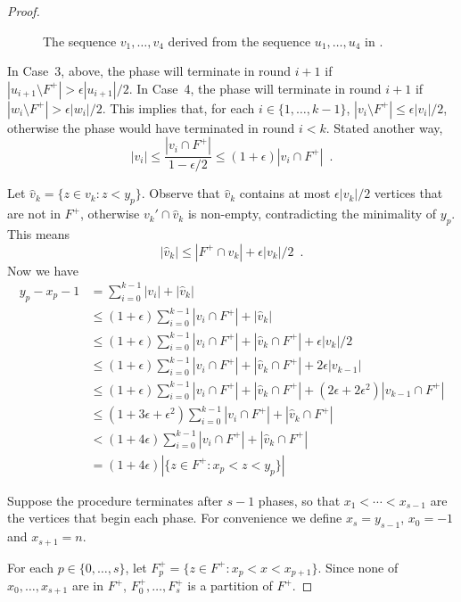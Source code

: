 \documentclass{patmorin}
\begin{document}
\begin{proof}
  \begin{figure}
    \caption{The sequence $v_1,\ldots,v_4$ derived from the sequence $u_1,\ldots,u_4$ in .}
  \end{figure}

  In Case~3, above, the phase will terminate in round $i+1$ if
  $|u_{i+1}\setminus F^+|>\epsilon|u_{i+1}|/2$.  In Case~4, the phase
  will terminate in round $i+1$ if $|w_i\setminus F^+|>\epsilon|w_i|/2$.
  This implies that, for each $i\in\{1,\ldots,k-1\}$, $|v_i\setminus
  F^+|\le\epsilon|v_i|/2$, otherwise the phase would have terminated
  in round $i<k$.  Stated another way,
  \[
    |v_i|\le \frac{|v_i\cap F^+|}{1-\epsilon/2} \le (1+\epsilon)|v_i\cap F^+| \enspace .
  \]

  Let $\hat{v}_k=\{z\in v_k:z< y_p\}$.  Observe that $\hat{v}_k$ contains
  at most $\epsilon|v_k|/2$ vertices that are not in $F^+$, otherwise
  $v_k'\cap \hat{v}_k$ is non-empty, contradicting the minimality of $y_p$. 
  This means
  \[    |\hat{v}_k| \le |F^+\cap \hat{v}_k| + \epsilon|v_k|/2 \enspace .
  \]
  Now we have
  \begin{align*}
    y_p - x_p - 1 & = \sum_{i=0}^{k-1} |v_i| + |\hat{v}_k|  \\
    & \le (1+\epsilon)\sum_{i=0}^{k-1} |v_i\cap F^+| + |\hat{v}_k| \\
    & \le (1+\epsilon)\sum_{i=0}^{k-1} |v_i\cap F^+| + |\hat{v}_k\cap F^+| + \epsilon|v_k|/2 \\ 
    & \le  (1+\epsilon)\sum_{i=0}^{k-1}|v_i\cap F^+| + |\hat{v}_k\cap F^+| + 2\epsilon|v_{k-1}| \\ 
    & \le  (1+\epsilon)\sum_{i=0}^{k-1}|v_i\cap F^+| + |\hat{v}_k\cap F^+| + (2\epsilon+2\epsilon^2)|v_{k-1}\cap F^+| \\ 
    & \le  (1+3\epsilon+\epsilon^2)\sum_{i=0}^{k-1}|v_i\cap F^+| + |\hat{v}_k\cap F^+| \\
    & <  (1+4\epsilon)\sum_{i=0}^{k-1}|v_i\cap F^+| + |\hat{v}_k\cap F^+|  \\
    & =  (1+4\epsilon)|\{z\in F^+: x_p< z< y_p\}|
  \end{align*}

  Suppose the procedure terminates after $s-1$ phases, so that $x_1<\cdots<x_{s-1}$ are the vertices that begin each phase.  For convenience we define $x_s=y_{s-1}$, $x_0=-1$ and $x_{s+1}=n$.

  For each $p\in\{0,\ldots,s\}$, let $F_p^+=\{z\in F^+: x_p <
  x < x_{p+1}\}$.  Since none of $x_0,\ldots,x_{s+1}$ are in $F^+$,
  $F_0^+,\ldots,F_{s}^+$ is a partition of $F^+$.  


\end{proof}
\end{document}
